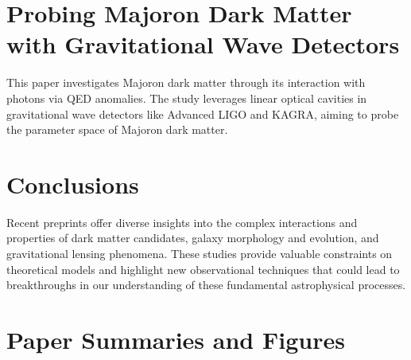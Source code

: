 \documentclass[11pt]{article}
\begin{document}
\section*{Probing Majoron Dark Matter with Gravitational Wave Detectors}
This paper investigates Majoron dark matter through its interaction with photons via QED anomalies. The study leverages linear optical cavities in gravitational wave detectors like Advanced LIGO and KAGRA, aiming to probe the parameter space of Majoron dark matter.
\section*{Conclusions}
Recent preprints offer diverse insights into the complex interactions and properties of dark matter candidates, galaxy morphology and evolution, and gravitational lensing phenomena. These studies provide valuable constraints on theoretical models and highlight new observational techniques that could lead to breakthroughs in our understanding of these fundamental astrophysical processes.
\newpage
\section*{Paper Summaries and Figures}
\end{document}
